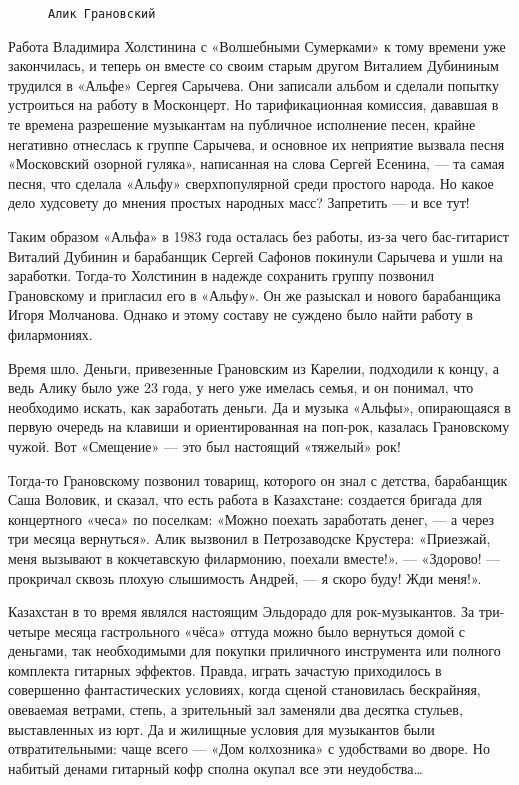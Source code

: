 \begin{wrapfigure}{R}{0.5\textwidth}
    \centering
    \caption{\texttt{Алик Грановский}}
\end{wrapfigure}

Работа Владимира Холстинина с «Волшебными Сумерками» к тому времени уже закончилась, и теперь он вместе со своим старым
другом Виталием Дубининым трудился в «Альфе» Сергея Сарычева. Они записали альбом и сделали попытку устроиться на работу
в Москонцерт. Но тарификационная комиссия, дававшая в те времена разрешение музыкантам на публичное исполнение песен,
крайне негативно отнеслась к группе Сарычева, и основное их неприятие вызвала песня «Московский озорной гуляка»,
написанная на слова Сергей Есенина, — та самая песня, что сделала «Альфу» сверхпопулярной среди простого народа. Но
какое дело худсовету до мнения простых народных масс? Запретить — и все тут!

Таким образом «Альфа» в 1983 года осталась без работы, из-за чего бас-гитарист Виталий Дубинин и барабанщик Сергей
Сафонов покинули Сарычева и ушли на заработки. Тогда-то Холстинин в надежде сохранить группу позвонил Грановскому и
пригласил его в «Альфу». Он же разыскал и нового барабанщика Игоря Молчанова. Однако и этому составу не суждено было
найти работу в филармониях.

Время шло. Деньги, привезенные Грановским из Карелии, подходили к концу, а ведь Алику было уже 23 года, у него уже
имелась семья, и он понимал, что необходимо искать, как заработать деньги. Да и музыка «Альфы», опирающаяся в первую
очередь на клавиши и ориентированная на поп-рок, казалась Грановскому чужой. Вот «Смещение» — это был настоящий
«тяжелый» рок!

Тогда-то Грановскому позвонил товарищ, которого он знал с детства, барабанщик Саша Воловик, и сказал, что есть работа в
Казахстане: создается бригада для концертного «чеса» по поселкам: «Можно поехать заработать денег, — а через три месяца
вернуться». Алик вызвонил в Петрозаводске Крустера: «Приезжай, меня вызывают в кокчетавскую филармонию, поехали
вместе!». — «Здорово! — прокричал сквозь плохую слышимость Андрей, — я скоро буду! Жди меня!».

Казахстан в то время являлся настоящим Эльдорадо для рок-музыкантов. За три-четыре месяца гастрольного «чёса» оттуда
можно было вернуться домой с деньгами, так необходимыми для покупки приличного инструмента или полного комплекта
гитарных эффектов. Правда, играть зачастую приходилось в совершенно фантастических условиях, когда сценой становилась
бескрайняя, овеваемая ветрами, степь, а зрительный зал заменяли два десятка стульев, выставленных из юрт. Да и жилищные
условия для музыкантов были отвратительными: чаще всего — «Дом колхозника» с удобствами во дворе. Но набитый денами
гитарный кофр сполна окупал все эти неудобства\ldots

